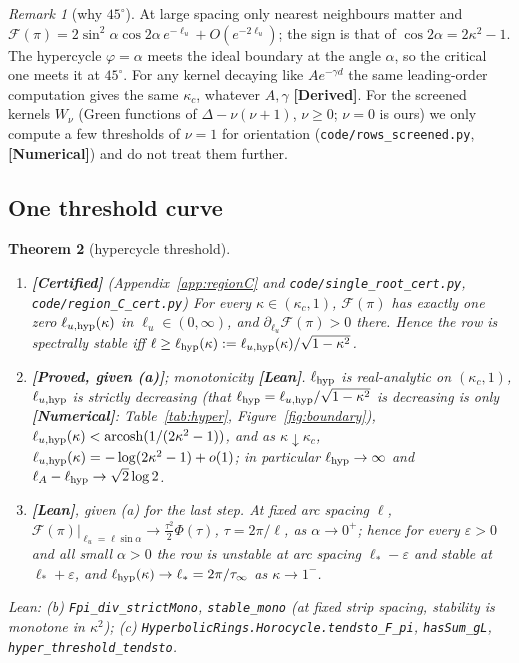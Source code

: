 \documentclass[11pt]{article}
\newtheorem{theorem}{Theorem}[section]
\theoremstyle{definition}
\theoremstyle{remark}
\newtheorem{remark}[theorem]{Remark}
\newcommand{\st}[1]{\textbf{[#1]}}
\newcommand{\lean}[1]{\nolinkurl{#1}}
\begin{document}
\begin{remark}[why $45^\circ$]\label{rem:45}
At large spacing only nearest neighbours matter and $\mathcal F(\pi)=2\sin^2\alpha\cos2\alpha\,e^{-\ell_u}+O(e^{-2\ell_u})$; the sign is
that of $\cos2\alpha=2\kappa^2-1$. The hypercycle $\varphi=\alpha$ meets the ideal boundary at the angle $\alpha$, so the critical one
meets it at $45^\circ$. For any kernel decaying like $Ae^{-\gamma d}$ the same leading-order computation gives the same
$\kappa_c$, whatever $A,\gamma$ \st{Derived}. For the screened kernels $W_\nu$ (Green functions of $\Delta-\nu(\nu+1)$, $\nu\ge0$;
$\nu=0$ is ours) we only compute a few thresholds of $\nu=1$ for orientation (\nolinkurl{code/rows_screened.py},
\st{Numerical}) and do not treat them further.
\end{remark}

\subsection{One threshold curve}
\begin{theorem}[hypercycle threshold]\label{thm:single}
\begin{enumerate}
\item[(a)] \st{Certified} (Appendix~\ref{app:regionC} and \nolinkurl{code/single_root_cert.py},
\nolinkurl{code/region_C_cert.py}) For every $\kappa\in(\kappa_c,1)$, $\mathcal F(\pi)$ has exactly one zero $\ell_{u,{\rm hyp}}(\kappa)$ in
$\ell_u\in(0,\infty)$, and $\partial_{\ell_u}\mathcal F(\pi)>0$ there. Hence the row is spectrally stable iff
$\ell\ge\ell_{\rm hyp}(\kappa):=\ell_{u,{\rm hyp}}(\kappa)/\sqrt{1-\kappa^2}$.
\item[(b)] \st{Proved, given (a)}; monotonicity \st{Lean}. $\ell_{\rm hyp}$ is real-analytic on $(\kappa_c,1)$, $\ell_{u,{\rm hyp}}$ is strictly
decreasing (that $\ell_{\rm hyp}=\ell_{u,{\rm hyp}}/\sqrt{1-\kappa^2}$ is decreasing is only \st{Numerical}: Table~\ref{tab:hyper}, Figure~\ref{fig:boundary}),
$\ell_{u,{\rm hyp}}(\kappa)<\operatorname{arcosh}(1/(2\kappa^2-1))$, and as $\kappa\downarrow\kappa_c$,
$\ell_{u,{\rm hyp}}(\kappa)=-\log(2\kappa^2-1)+o(1)$; in particular $\ell_{\rm hyp}\to\infty$ and $\ell_A-\ell_{\rm hyp}\to\sqrt2\log2$.
\item[(c)] \st{Lean}, given (a) for the last step. At fixed arc spacing $\ell$, $\mathcal F(\pi)|_{\ell_u=\ell\sin\alpha}\to\frac{\tau^2}2\Phi(\tau)$,
$\tau=2\pi/\ell$, as $\alpha\to0^+$; hence for every $\varepsilon>0$ and all small $\alpha>0$ the row is unstable at arc spacing $\ell_*-\varepsilon$
and stable at $\ell_*+\varepsilon$, and $\ell_{\rm hyp}(\kappa)\to\ell_*=2\pi/\tau_\infty$ as $\kappa\to1^-$.
\end{enumerate}
Lean: (b) \lean{Fpi_div_strictMono}, \lean{stable_mono} (at fixed strip spacing, stability is monotone in $\kappa^2$); (c)
\lean{HyperbolicRings.Horocycle.tendsto_F_pi}, \lean{hasSum_gL}, \lean{hyper_threshold_tendsto}.
\end{theorem}
\end{document}
